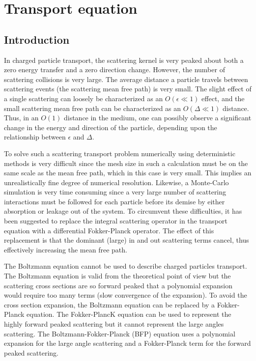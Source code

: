 \chapter{Transport equation}
\section{Introduction}
In charged particle transport, the scattering kernel is very peaked about both
a zero energy transfer and a zero direction change. However, the number of
scattering collisions is very large. The average distance a particle travels
between scattering events (the scattering mean free path) is very small. The
slight effect of a single scattering can loosely be characterized as an
$O(\epsilon \ll 1)$ effect, and the small scattering mean free path can be
characterized as an $O(\Delta \ll 1)$ distance. Thus, in an $O(1)$ distance in
the medium, one can possibly observe a significant change in the energy and
direction of the particle, depending upon the relationship between $\epsilon$
and $\Delta$\cite{pomraning}.

To solve such a scattering transport problem numerically using deterministic
methods is very difficult since the mesh size in such a calculation must be on
the same scale as the mean free path, which in this case is very small. This
implies an unrealistically fine degree of numerical resolution. Likewise, a
Monte-Carlo simulation is very time consuming since a very large number of
scattering interactions must be followed for each particle before its demise
by either absorption or leakage out of the system. To circumvent these
difficulties, it has been suggested to replace the integral scattering
operator in the transport equation with a differential Fokker-Planck operator.
The effect of this replacement is that the dominant (large) in and out
scattering terms cancel, thus effectively increasing the mean free
path\cite{pomraning}.

The Boltzmann equation cannot be used to describe charged particles transport.
The Boltzmann equation is valid from the theoretical point of view but the
scattering cross sections are so forward peaked that a polynomial expansion
would require too many terms (slow convergence of the expansion). To avoid the
cross section expansion, the Boltzmann equation can be replaced by a
Fokker-Planck equation. The Fokker-PlancK equation can be used to represent
the highly forward peaked scattering but it cannot represent the large angles
scattering. The Boltzmann-Fokker-Planck (BFP) equation uses a polynomial expansion
for the large angle scattering and a Fokker-Planck term for the forward peaked
scattering\cite{ligou}.
